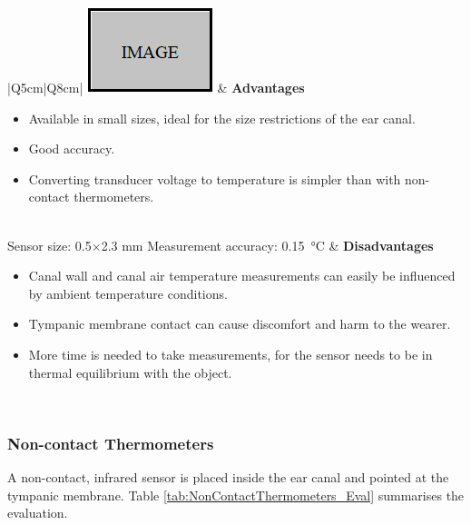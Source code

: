\begin{table}[H]
\caption{Contact thermometers evaluation}
\label{tab:ContactThermometers_Eval}
\renewcommand{\arraystretch}{1.3}
\centering
\begin{tabular}{|Q{5cm}|Q{8cm}|} 
 \hline
\includegraphics[scale=1]{figs/Image.png}	& 
	\textbf{Advantages}
	\begin{itemize}[leftmargin=1em, noitemsep, topsep=2pt]
	\item Available in small sizes, ideal for the size restrictions of the ear canal.
	\item Good accuracy.
	\item Converting transducer voltage to temperature is simpler than with non-contact thermometers.
	\end{itemize}\\
						
\hline
Sensor size: 0.5$\times$2.3 mm \newline Measurement accuracy: \newline \SI{0.15}{\celsius}	& 
	\textbf{Disadvantages}					
	\begin{itemize}[leftmargin=1em, noitemsep, topsep=2pt]
	\item Canal wall and canal air temperature measurements can easily be influenced by ambient temperature conditions.
	\item Tympanic membrane contact can cause discomfort and harm to the wearer.
	\item More time is needed to take measurements, for the sensor needs to be in thermal equilibrium with the object.
	\end{itemize}\\

 \hline
\end{tabular}
\end{table}



\subsubsection{Non-contact Thermometers}
A non-contact, infrared sensor is placed inside the ear canal and pointed at the tympanic membrane. Table \ref{tab:NonContactThermometers_Eval} summarises the evaluation.

